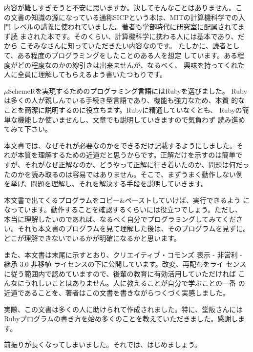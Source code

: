 内容が難しすぎそうと不安に思いますか。決してそんなことはありません。こ
の文書の知識の源になっている通称SICPという本は、MITの計算機科学での入門
レベルの講義に使われていました。著者も学部時代に研究室に配属されてまず読
まされた本です。そのくらい、計算機科学に携わる人には基本であり、だから
こそみなさんに知っていただきたい内容なのです。
たしかに、読者として、ある程度のプログラミングをしたことのある人を想定
しています。ある程度がどの程度なのかの線引きは出来ませんが、なるべく、
興味を持ってくれた人に全員に理解してもらえるよう書いたつもりです。

$\mu$SchemeRを実現するためのプログラミング言語にはRubyを選びました。
Rubyは多くの人が親しんでいる手続き型言語であり、機能も強力なため、本質
的なことを簡潔に説明するのに役立ちます。Rubyに精通していなくとも、
Rubyの簡単な機能しか使いませんし、文章でも説明していきますので気負わず
読み進めてみて下さい。

本文書では、なぜそれが必要なのかをできるだけ記載するようにしました。そ
れが本質を理解するための近道だと思うからです。正解だけを示すのは簡単で
すが、それがなぜ正解なのか、どうやって正解に行き着いたのか、問題は何だっ
たのかを読み取るのは容易ではありません。そこで、まずうまく動作しない例
を挙げ、問題を理解し、それを解決する手段を説明していきます。

本文書で出てくるプログラムをコピー$\&$ペーストしていけば、実行できるよう
になっています。動作することを確認するくらいには役立つでしょう。ただし、
本当に理解したいのであれば、なるべく自分でプログラミングしてみてくださ
い。それも本文書のプログラムを見て理解した後は、そのプログラムを見ずに。
どこが理解できないでいるかが明確になるかと思います。

また、本文書は末尾に示すとおり、クリエイティブ・コモンズ 表示 - 非営利
- 継承 3.0 非移植 ライセンスの下に公開しています。改変、再配布をライ
センスに従う範囲内で認めていますので、後輩の教育に有効活用していただければ
こんなにうれしいことはありません。人に教えることが自分で学ぶことの一番
の近道であることを、著者はこの文書を書きながらつくづく実感しました。

実際、この文書は多くの人に助けられて作成されました。特に、堂阪さんには
Rubyプログラムの書き方を始め多くのことを教えていただきました。感謝しま
す。

前振りが長くなってしまいました。それでは、はじめましょう。
